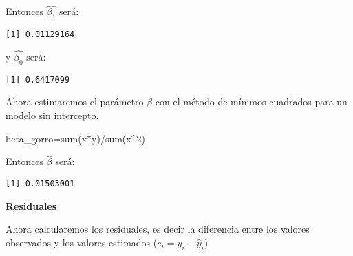 \documentclass[
  a4paper,
  oneside,
  openany]{book}
\newenvironment{Shaded}{\begin{snugshade}}{\end{snugshade}}
\newcommand{\DecValTok}[1]{\textcolor[rgb]{0.00,0.00,0.81}{#1}}
\newcommand{\FunctionTok}[1]{\textcolor[rgb]{0.00,0.00,0.00}{#1}}
\newcommand{\NormalTok}[1]{#1}
\newcommand{\OtherTok}[1]{\textcolor[rgb]{0.56,0.35,0.01}{#1}}
\newcommand{\SpecialCharTok}[1]{\textcolor[rgb]{0.00,0.00,0.00}{#1}}
\begin{document}
\begin{Shaded}
\end{Shaded}

Entonces \(\hat{\beta_{1}}\) será:

\begin{verbatim}
[1] 0.01129164
\end{verbatim}

y \(\hat{\beta_{0}}\) será:

\begin{verbatim}
[1] 0.6417099
\end{verbatim}

Ahora estimaremos el parámetro \(\beta\) con el método de mínimos cuadrados para un modelo sin intercepto.

\begin{Shaded}
\begin{Highlighting}[]
\NormalTok{beta\_gorro}\OtherTok{=}\FunctionTok{sum}\NormalTok{(x}\SpecialCharTok{*}\NormalTok{y)}\SpecialCharTok{/}\FunctionTok{sum}\NormalTok{(x}\SpecialCharTok{\^{}}\DecValTok{2}\NormalTok{)}
\end{Highlighting}
\end{Shaded}

Entonces \(\hat{\beta}\) será:

\begin{verbatim}
[1] 0.01503001
\end{verbatim}

\textbf{Residuales}

Ahora calcularemos los residuales, es decir la diferencia entre los valores observados y los valores estimados (\(e_i = y_i-\hat{y}_i\))
\end{document}
